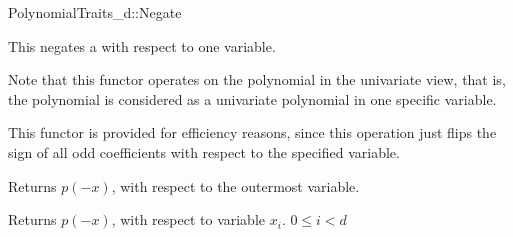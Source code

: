\begin{ccRefConcept}{PolynomialTraits_d::Negate}
\ccDefinition

This  negates a  with  
respect to one variable. 

Note that this functor operates on the polynomial in the univariate view, that is, 
the polynomial is considered as a univariate polynomial in one specific variable. 

This functor is provided for efficiency reasons, since this operation just flips the sign 
of all odd coefficients with respect to the specified variable.  

\ccRefines 
{}

\ccTypes
{}
\ccGlue
{}

\ccOperations
{}
         { Returns $p(-x)$, with respect to the outermost variable. }

         { Returns $p(-x)$, with respect to variable $x_i$. 
           \ccPrecond $0 \leq i  < d$
         }


\ccSeeAlso

\\
\\

\end{ccRefConcept}
